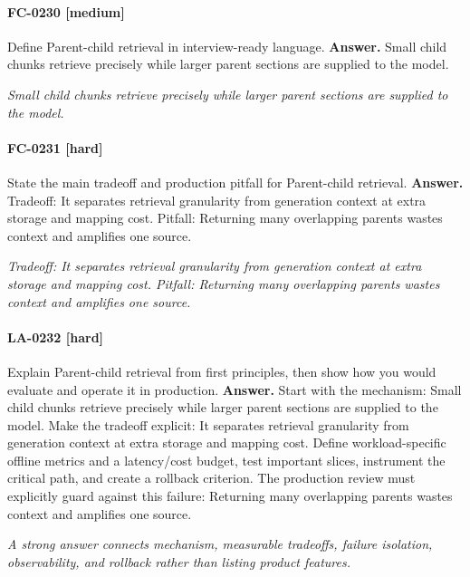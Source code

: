 \paragraph{FC-0230 [medium]} Define Parent-child retrieval in interview-ready language.
\noindent\textbf{Answer.} Small child chunks retrieve precisely while larger parent sections are supplied to the model.
\par\textit{Small child chunks retrieve precisely while larger parent sections are supplied to the model.}
\paragraph{FC-0231 [hard]} State the main tradeoff and production pitfall for Parent-child retrieval.
\noindent\textbf{Answer.} Tradeoff: It separates retrieval granularity from generation context at extra storage and mapping cost. Pitfall: Returning many overlapping parents wastes context and amplifies one source.
\par\textit{Tradeoff: It separates retrieval granularity from generation context at extra storage and mapping cost. Pitfall: Returning many overlapping parents wastes context and amplifies one source.}
\paragraph{LA-0232 [hard]} Explain Parent-child retrieval from first principles, then show how you would evaluate and operate it in production.
\noindent\textbf{Answer.} Start with the mechanism: Small child chunks retrieve precisely while larger parent sections are supplied to the model. Make the tradeoff explicit: It separates retrieval granularity from generation context at extra storage and mapping cost. Define workload-specific offline metrics and a latency/cost budget, test important slices, instrument the critical path, and create a rollback criterion. The production review must explicitly guard against this failure: Returning many overlapping parents wastes context and amplifies one source.
\par\textit{A strong answer connects mechanism, measurable tradeoffs, failure isolation, observability, and rollback rather than listing product features.}
